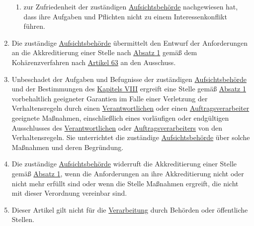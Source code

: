 \begin{enumerate}
\begin{enumerate}
    \item zur Zufriedenheit der zuständigen \hyperref[itm:04-21]{Aufsichtsbehörde} nachgewiesen hat, dass ihre Aufgaben
     und Pflichten nicht zu einem Interessenkonflikt führen.%
    \label{itm:41-2d}

  \end{enumerate}

  \item Die zuständige \hyperref[itm:04-21]{Aufsichtsbehörde} übermittelt den Entwurf der Anforderungen an die
   Akkreditierung einer Stelle nach \hyperref[itm:41-1]{Absatz 1} gemäß dem Kohärenzverfahren nach \hyperref[ch:63]
   {Artikel 63} an den Ausschuss.%
  \label{itm:41-3}

  \item Unbeschadet der Aufgaben und Befugnisse der zuständigen \hyperref[itm:04-21]{Aufsichtsbehörde} und der
   Bestimmungen des \hyperref[part:8]{Kapitels VIII} ergreift eine Stelle gemäß \hyperref[itm:41-1]{Absatz 1}
   vorbehaltlich geeigneter Garantien im Falle einer Verletzung der Verhaltensregeln durch einen \hyperref[itm:04-7]
   {Verantwortlichen} oder einen \hyperref[itm:04-8]{Auftragsverarbeiter} geeignete Maßnahmen, einschließlich eines
   vorläufigen oder endgültigen Ausschlusses des \hyperref[itm:04-7]{Verantwortlichen} oder \hyperref[itm:04-8]
   {Auftragsverarbeiters} von den Verhaltensregeln. Sie unterrichtet die zuständige \hyperref[itm:04-21]
   {Aufsichtsbehörde} über solche Maßnahmen und deren Begründung.%
  \label{itm:41-4}

  \item Die zuständige \hyperref[itm:04-21]{Aufsichtsbehörde} widerruft die Akkreditierung einer Stelle gemäß \hyperref
   [itm:41-1]{Absatz 1}, wenn die Anforderungen an ihre Akkreditierung nicht oder nicht mehr erfüllt sind oder wenn
   die Stelle Maßnahmen ergreift, die nicht mit dieser Verordnung vereinbar sind.%
  \label{itm:41-5}

  \item Dieser Artikel gilt nicht für die \hyperref[itm:04-2]{Verarbeitung} durch Behörden oder öffentliche Stellen.%
  \label{itm:41-6}

\end{enumerate}


